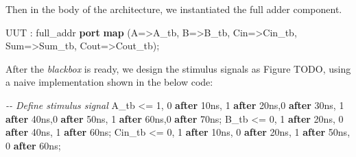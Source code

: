 \documentclass[
]{article}
\newenvironment{Shaded}{}{}
\newcommand{\BaseNTok}[1]{\textcolor[rgb]{0.25,0.63,0.44}{#1}}
\newcommand{\CommentTok}[1]{\textcolor[rgb]{0.38,0.63,0.69}{\textit{#1}}}
\newcommand{\KeywordTok}[1]{\textcolor[rgb]{0.00,0.44,0.13}{\textbf{#1}}}
\newcommand{\NormalTok}[1]{#1}
\newcommand{\OtherTok}[1]{\textcolor[rgb]{0.00,0.44,0.13}{#1}}
\begin{document}
Then in the body of the architecture, we instantiated the full adder
component.

\begin{Shaded}
\begin{Highlighting}[]
\NormalTok{    UUT }\OtherTok{:}\NormalTok{ full\_addr }\KeywordTok{port} \KeywordTok{map}\NormalTok{ (A}\OtherTok{=\textgreater{}}\NormalTok{A\_tb}\OtherTok{,}\NormalTok{ B}\OtherTok{=\textgreater{}}\NormalTok{B\_tb}\OtherTok{,}\NormalTok{ Cin}\OtherTok{=\textgreater{}}\NormalTok{Cin\_tb}\OtherTok{,}\NormalTok{ Sum}\OtherTok{=\textgreater{}}\NormalTok{Sum\_tb}\OtherTok{,}\NormalTok{ Cout}\OtherTok{=\textgreater{}}\NormalTok{Cout\_tb);}
\end{Highlighting}
\end{Shaded}

After the \emph{blackbox} is ready, we design the stimulus signals as
Figure TODO, using a naive implementation shown in the below code:

\begin{Shaded}
\begin{Highlighting}[]
    \CommentTok{{-}{-} Define stimulus signal}
\NormalTok{    A\_tb }\OtherTok{\textless{}=} \BaseNTok{\textquotesingle{}1\textquotesingle{}}\OtherTok{,} \BaseNTok{\textquotesingle{}0\textquotesingle{}} \KeywordTok{after}\NormalTok{ 10ns}\OtherTok{,} \BaseNTok{\textquotesingle{}1\textquotesingle{}} \KeywordTok{after}\NormalTok{ 20ns}\OtherTok{,}\BaseNTok{\textquotesingle{}0\textquotesingle{}} \KeywordTok{after}\NormalTok{ 30ns}\OtherTok{,} \BaseNTok{\textquotesingle{}1\textquotesingle{}} \KeywordTok{after}\NormalTok{ 40ns}\OtherTok{,}\BaseNTok{\textquotesingle{}0\textquotesingle{}} \KeywordTok{after}\NormalTok{ 50ns}\OtherTok{,} \BaseNTok{\textquotesingle{}1\textquotesingle{}} \KeywordTok{after}\NormalTok{ 60ns}\OtherTok{,}\BaseNTok{\textquotesingle{}0\textquotesingle{}} \KeywordTok{after}\NormalTok{ 70ns;}
\NormalTok{    B\_tb }\OtherTok{\textless{}=} \BaseNTok{\textquotesingle{}0\textquotesingle{}}\OtherTok{,} \BaseNTok{\textquotesingle{}1\textquotesingle{}} \KeywordTok{after}\NormalTok{ 20ns}\OtherTok{,} \BaseNTok{\textquotesingle{}0\textquotesingle{}} \KeywordTok{after}\NormalTok{ 40ns}\OtherTok{,} \BaseNTok{\textquotesingle{}1\textquotesingle{}} \KeywordTok{after}\NormalTok{ 60ns;}
\NormalTok{    Cin\_tb }\OtherTok{\textless{}=} \BaseNTok{\textquotesingle{}0\textquotesingle{}}\OtherTok{,} \BaseNTok{\textquotesingle{}1\textquotesingle{}} \KeywordTok{after}\NormalTok{ 10ns}\OtherTok{,} \BaseNTok{\textquotesingle{}0\textquotesingle{}} \KeywordTok{after}\NormalTok{ 20ns}\OtherTok{,} \BaseNTok{\textquotesingle{}1\textquotesingle{}} \KeywordTok{after}\NormalTok{ 50ns}\OtherTok{,} \BaseNTok{\textquotesingle{}0\textquotesingle{}} \KeywordTok{after}\NormalTok{ 60ns;}
\end{Highlighting}
\end{Shaded}
\end{document}
